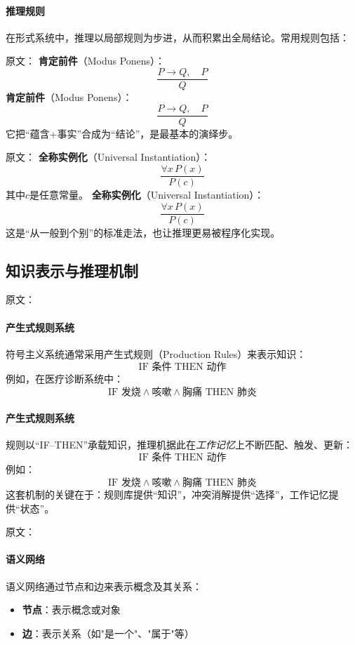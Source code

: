 \paragraph{推理规则}
在形式系统中，推理以局部规则为步进，从而积累出全局结论。常用规则包括：

原文：
\textbf{肯定前件}（Modus Ponens）：
$$\frac{P \rightarrow Q, \quad P}{Q}$$
\textbf{肯定前件}（Modus Ponens）：
$$\frac{P \rightarrow Q, \quad P}{Q}$$
它把“蕴含+事实”合成为“结论”，是最基本的演绎步。

原文：
\textbf{全称实例化}（Universal Instantiation）：
$$\frac{\forall x \, P(x)}{P(c)}$$
其中$c$是任意常量。
\textbf{全称实例化}（Universal Instantiation）：
$$\frac{\forall x \, P(x)}{P(c)}$$
这是“从一般到个别”的标准走法，也让推理更易被程序化实现。


\subsection{知识表示与推理机制}

原文：
\paragraph{产生式规则系统}
符号主义系统通常采用产生式规则（Production Rules）来表示知识：
$$\text{IF } \text{条件} \text{ THEN } \text{动作}$$
例如，在医疗诊断系统中：
$$\text{IF } \text{发烧} \land \text{咳嗽} \land \text{胸痛} \text{ THEN } \text{肺炎}$$
\paragraph{产生式规则系统}
规则以“IF–THEN”承载知识，推理机据此在\emph{工作记忆}上不断匹配、触发、更新：  
$$\text{IF } \text{条件} \text{ THEN } \text{动作}$$
例如：
$$\text{IF } \text{发烧} \land \text{咳嗽} \land \text{胸痛} \text{ THEN } \text{肺炎}$$
这套机制的关键在于：规则库提供“知识”，冲突消解提供“选择”，工作记忆提供“状态”。

原文：
\paragraph{语义网络}
语义网络通过节点和边来表示概念及其关系：
\begin{itemize}
\item \textbf{节点}：表示概念或对象
\item \textbf{边}：表示关系（如"是一个"、"属于"等）
\end{itemize}
